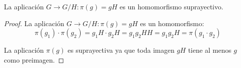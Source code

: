 \begin{thm}
    La aplicación $G \to G / H:\pi(g) = gH$ es un homomorfismo suprayectivo.
\end{thm}

\begin{proof}
    La aplicación $G \to G / H:\pi(g) =gH$ es un homomorfismo:
    \begin{equation}
        \pi(g_{1}) \cdot \pi (g_{2}) = g_{1}H \cdot g_{2}H = g_{1}g_{2}H H = g_{1}g_{2}H = \pi(g_{1}\cdot g_{2})
    \end{equation}

    La aplicación $\pi(g)$ es suprayectiva ya que toda imagen $gH$ tiene al menos $g$ como preimagen.
\end{proof}
